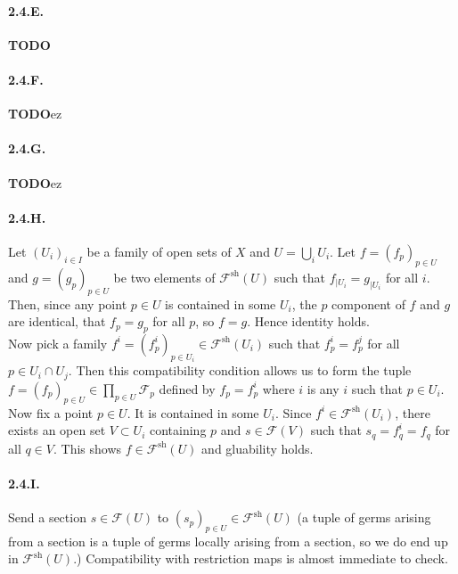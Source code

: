 \documentclass{article}
\newcommand{\sh}{\mathrm{sh}}
\newcommand{\todo}{\textbf{TODO}}
\newcommand{\Fsheaf}{\mathscr{F}}
\begin{document}
\paragraph{2.4.E.} \todo

\paragraph{2.4.F.} \todo ez

\paragraph{2.4.G.} \todo ez

\paragraph{2.4.H.} Let $(U_i)_{i\in I}$ be a family of open sets of $X$ and $U = \bigcup_i U_i$. Let $f = (f_p)_{p\in U}$ and $g = (g_p)_{p \in U}$ be two elements of $\Fsheaf^\sh(U)$ such that $f_{\mid U_i} = g_{\mid U_i}$ for all $i$. Then, since any point $p \in U$ is contained in some $U_i$, the $p$ component of $f$ and $g$ are identical, that $f_p = g_p$ for all $p$, so $f=g$. Hence identity holds. \\
Now pick a family $f^i = (f^i_p)_{p \in U_i} \in \Fsheaf^\sh(U_i)$ such that $f^i_p = f^j_p$ for all $p \in U_i \cap U_j$. Then this compatibility condition allows us to form the tuple $f = (f_p)_{p \in U} \in \prod_{p \in U} \Fsheaf_p$ defined by $f_p = f^i_p$ where $i$ is any $i$ such that $p \in U_i$. Now fix a point $p \in U$. It is contained in some $U_i$. Since $f^i \in \Fsheaf^\sh(U_i)$, there exists an open set $V \subset U_i$ containing $p$ and $s \in \Fsheaf(V)$ such that $s_q = f_q^i = f_q$ for all $q \in V$. This shows $f \in \Fsheaf^\sh (U)$ and gluability holds.

\paragraph{2.4.I.} Send a section $s \in \Fsheaf(U)$ to $(s_p)_{p \in U} \in \Fsheaf^\sh(U)$ (a tuple of germs arising from a section is a tuple of germs locally arising from a section, so we do end up in $\Fsheaf^\sh(U)$.) Compatibility with restriction maps is almost immediate to check.
\end{document}
